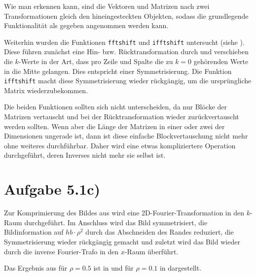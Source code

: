 Wie man erkennen kann, sind die Vektoren und Matrizen nach zwei Transformationen
gleich den hineingesteckten Objekten, sodass die grundlegende Funktionalität als
gegeben angenommen werden kann.

Weiterhin wurden die Funktionen \texttt{fftshift} und \texttt{ifftshift}
untersucht (siehe ). Diese führen zunächst eine Hin- bzw. Rücktransformation
durch und verschieben die $k$-Werte in der Art, dass pro Zeile und Spalte die 
zu $k=0$ gehörenden Werte in die Mitte gelangen. Dies entspricht einer Symmetrisierung.
Die Funktion \texttt{ifftshift} macht diese Symmetrisierung wieder rückgängig, um
die ursprüngliche Matrix wiederzubekommen.

Die beiden Funktionen sollten sich nicht unterscheiden, da nur Blöcke der Matrizen
vertauscht und bei der Rücktransformation wieder zurückvertauscht werden sollten.
Wenn aber die Länge der Matrizen in einer oder zwei der Dimensionen ungerade ist,
dann ist diese einfache Blockvertauschung nicht mehr ohne weiteres durchführbar.
Daher wird eine etwas kompliziertere Operation durchgeführt, deren Inverses nicht
mehr sie selbst ist.


\section*{Aufgabe 5.1c)}
Zur Komprimierung des Bildes aus  wird eine 2D-Fourier-Transformation
in den $k$-Raum durchgeführt. Im Anschluss wird das Bild symmetrisiert, die Bildinformation
auf $hb\cdot ρ^2$ durch das Abschneiden des Randes reduziert, die Symmetrisierung wieder
rückgängig gemacht und zuletzt wird das Bild wieder durch die inverse Fourier-Trafo in den
$x$-Raum überführt.

Das Ergebnis aus  für $ρ=0.5$ ist in  und für $ρ=0.1$ in  dargestellt.


